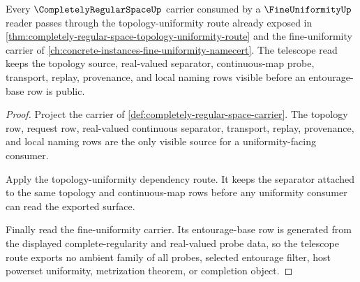 \begin{theorem}
\label{thm:completely-regular-space-fine-uniformity-telescope-route}
Every $\CompletelyRegularSpaceUp$ carrier consumed by a $\FineUniformityUp$ reader passes through the topology-uniformity route already exposed in \autoref{thm:completely-regular-space-topology-uniformity-route} and the fine-uniformity carrier of \autoref{ch:concrete-instances-fine-uniformity-namecert}. The telescope read keeps the topology source, real-valued separator, continuous-map probe, transport, replay, provenance, and local naming rows visible before an entourage-base row is public.
\end{theorem}
\begin{proof}
Project the carrier of \autoref{def:completely-regular-space-carrier}. The topology row, request row, real-valued continuous separator, transport, replay, provenance, and local naming rows are the only visible source for a uniformity-facing consumer.

Apply the topology-uniformity dependency route. It keeps the separator attached to the same topology and continuous-map rows before any uniformity consumer can read the exported surface.

Finally read the fine-uniformity carrier. Its entourage-base row is generated from the displayed complete-regularity and real-valued probe data, so the telescope route exports no ambient family of all probes, selected entourage filter, host powerset uniformity, metrization theorem, or completion object.
\end{proof}
